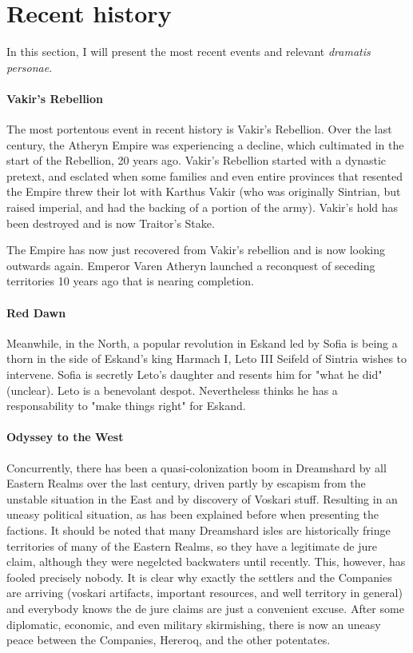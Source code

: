 \section{Recent history}

In this section, I will present the most recent events and relevant \textit{dramatis personae}.

\paragraph{Vakir's Rebellion}

The most portentous event in recent history is Vakir's Rebellion. Over the last century, the Atheryn Empire was experiencing a decline, which cultimated in the start of the Rebellion, 20 years ago. Vakir's Rebellion started with a dynastic pretext, and esclated when some families and even entire provinces that resented the Empire threw their lot with Karthus Vakir (who was originally Sintrian, but raised imperial, and had the backing of a portion of the army). Vakir's hold has been destroyed and is now Traitor's Stake.


The Empire has now just recovered from Vakir's rebellion and is now looking outwards again. Emperor Varen Atheryn launched a reconquest of seceding territories 10 years ago that is nearing completion.


\paragraph{Red Dawn}

Meanwhile, in the North, a popular revolution in Eskand led by Sofia is being a thorn in the side of Eskand's king Harmach I, Leto III Seifeld of Sintria wishes to intervene. Sofia is secretly Leto's daughter and resents him for "what he did" (unclear). Leto is a benevolant despot. Nevertheless thinks he has a responsability to "make things right" for Eskand.

\paragraph{Odyssey to the West}
 
Concurrently, there has been a quasi-colonization boom in Dreamshard by all Eastern Realms over the last century, driven partly by escapism from the unstable situation in the East and by discovery of Voskari stuff. Resulting in an uneasy political situation, as has been explained before when presenting the factions. It should be noted that many Dreamshard isles are historically fringe territories of many of the Eastern Realms, so they have a legitimate de jure claim, although they were negelcted backwaters until recently. This, however, has fooled precisely nobody. It is clear why exactly the settlers and the Companies are arriving (voskari artifacts, important resources, and well territory in general) and everybody knows the de jure claims are just a convenient excuse. After some diplomatic, economic, and even military skirmishing, there is now an uneasy peace between the Companies, Hereroq, and the other potentates.

